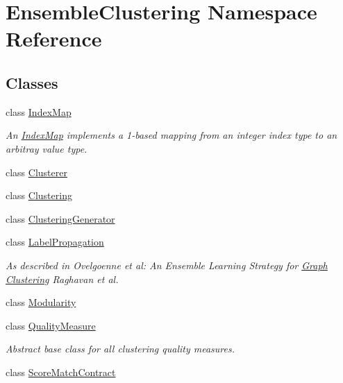 \hypertarget{namespace_ensemble_clustering}{\section{Ensemble\-Clustering Namespace Reference}
\label{namespace_ensemble_clustering}
}
\subsection*{Classes}
\begin{DoxyCompactItemize}
\item 
class \hyperlink{class_ensemble_clustering_1_1_index_map}{Index\-Map}
\begin{DoxyCompactList}\small\item\em An \hyperlink{class_ensemble_clustering_1_1_index_map}{Index\-Map} implements a 1-\/based mapping from an integer index type to an arbitray value type. \end{DoxyCompactList}\item 
class \hyperlink{class_ensemble_clustering_1_1_clusterer}{Clusterer}
\item 
class \hyperlink{class_ensemble_clustering_1_1_clustering}{Clustering}
\item 
class \hyperlink{class_ensemble_clustering_1_1_clustering_generator}{Clustering\-Generator}
\item 
class \hyperlink{class_ensemble_clustering_1_1_label_propagation}{Label\-Propagation}
\begin{DoxyCompactList}\small\item\em As described in Ovelgoenne et al\-: An Ensemble Learning Strategy for \hyperlink{class_ensemble_clustering_1_1_graph}{Graph} \hyperlink{class_ensemble_clustering_1_1_clustering}{Clustering} Raghavan et al. \end{DoxyCompactList}\item 
class \hyperlink{class_ensemble_clustering_1_1_modularity}{Modularity}
\item 
class \hyperlink{class_ensemble_clustering_1_1_quality_measure}{Quality\-Measure}
\begin{DoxyCompactList}\small\item\em Abstract base class for all clustering quality measures. \end{DoxyCompactList}\item 
class \hyperlink{class_ensemble_clustering_1_1_score_match_contract}{Score\-Match\-Contract}
\item 

\end{DoxyCompactItemize}
